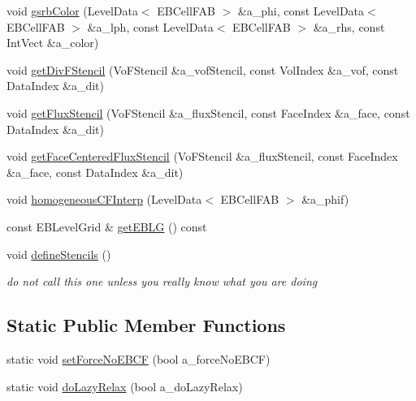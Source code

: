 \begin{DoxyCompactItemize}
\item 
void \hyperlink{classnwoebconductivityop_a25c42d521ee42bc358eccd02903a94f3}{gsrb\+Color} (Level\+Data$<$ E\+B\+Cell\+F\+AB $>$ \&a\+\_\+phi, const Level\+Data$<$ E\+B\+Cell\+F\+AB $>$ \&a\+\_\+lph, const Level\+Data$<$ E\+B\+Cell\+F\+AB $>$ \&a\+\_\+rhs, const Int\+Vect \&a\+\_\+color)
\item 
void \hyperlink{classnwoebconductivityop_ac9d18476ce5412dd36c875e9d1d612c9}{get\+Div\+F\+Stencil} (Vo\+F\+Stencil \&a\+\_\+vof\+Stencil, const Vol\+Index \&a\+\_\+vof, const Data\+Index \&a\+\_\+dit)
\item 
void \hyperlink{classnwoebconductivityop_a77c53a3bb6aaeedbf70d10390ad6ce84}{get\+Flux\+Stencil} (Vo\+F\+Stencil \&a\+\_\+flux\+Stencil, const Face\+Index \&a\+\_\+face, const Data\+Index \&a\+\_\+dit)
\item 
void \hyperlink{classnwoebconductivityop_a37d164426f130d2037f84b461970a534}{get\+Face\+Centered\+Flux\+Stencil} (Vo\+F\+Stencil \&a\+\_\+flux\+Stencil, const Face\+Index \&a\+\_\+face, const Data\+Index \&a\+\_\+dit)
\item 
void \hyperlink{classnwoebconductivityop_a89c8ced282f00f7841022119ae33722b}{homogeneous\+C\+F\+Interp} (Level\+Data$<$ E\+B\+Cell\+F\+AB $>$ \&a\+\_\+phif)
\item 
const E\+B\+Level\+Grid \& \hyperlink{classnwoebconductivityop_a774aeb03f103ba9a34ddb0de0af9018e}{get\+E\+B\+LG} () const 
\item 
void \hyperlink{classnwoebconductivityop_a1da7f4d8b28562b907733a2d36ee60a3}{define\+Stencils} ()
\begin{DoxyCompactList}\small\item\em do not call this one unless you really know what you are doing \end{DoxyCompactList}\end{DoxyCompactItemize}
\subsection*{Static Public Member Functions}
\begin{DoxyCompactItemize}
\item 
static void \hyperlink{classnwoebconductivityop_a76a5fd0a294bbdfd4d9568201a54aabc}{set\+Force\+No\+E\+B\+CF} (bool a\+\_\+force\+No\+E\+B\+CF)
\item 
static void \hyperlink{classnwoebconductivityop_a58a7a699f27d72f75fa8a23d2081a5b6}{do\+Lazy\+Relax} (bool a\+\_\+do\+Lazy\+Relax)
\end{DoxyCompactItemize}

